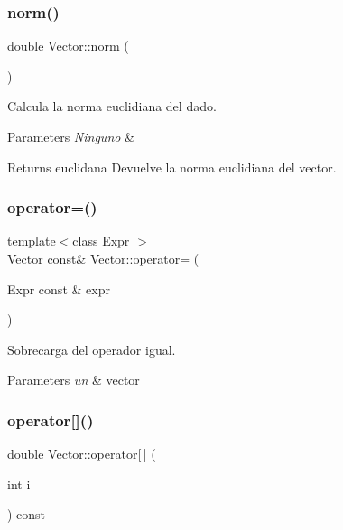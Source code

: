 \subsubsection{\texorpdfstring{norm()}{norm()}}
{\footnotesize\ttfamily double Vector\+::norm (\begin{DoxyParamCaption}{ }\end{DoxyParamCaption})}



Calcula la norma euclidiana del dado. 


\begin{DoxyParams}{Parameters}
{\em Ninguno} & \\
\hline
\end{DoxyParams}
\begin{DoxyReturn}{Returns}
euclidana Devuelve la norma euclidiana del vector. 
\end{DoxyReturn}
\hypertarget{class_vector_aa53aac2803bd8fd85ddb426b7d9f2978}{}\label{class_vector_aa53aac2803bd8fd85ddb426b7d9f2978} 
\subsubsection{\texorpdfstring{operator=()}{operator=()}}
{\footnotesize\ttfamily template$<$class Expr $>$ \\
\hyperlink{class_vector}{Vector} const\& Vector\+::operator= (\begin{DoxyParamCaption}\item[{Expr const \&}]{expr }\end{DoxyParamCaption})\hspace{0.3cm}{\ttfamily [inline]}}



Sobrecarga del operador igual. 


\begin{DoxyParams}{Parameters}
{\em un} & vector \\
\hline
\end{DoxyParams}
\hypertarget{class_vector_a2fa24314ea9397e50c47484705952a55}{}\label{class_vector_a2fa24314ea9397e50c47484705952a55} 
\subsubsection{\texorpdfstring{operator[]()}{operator[]()}\hspace{0.1cm}{\footnotesize\ttfamily [1/2]}}
{\footnotesize\ttfamily double Vector\+::operator\mbox{[}$\,$\mbox{]} (\begin{DoxyParamCaption}\item[{int}]{i }\end{DoxyParamCaption}) const\hspace{0.3cm}{\ttfamily [inline]}}



